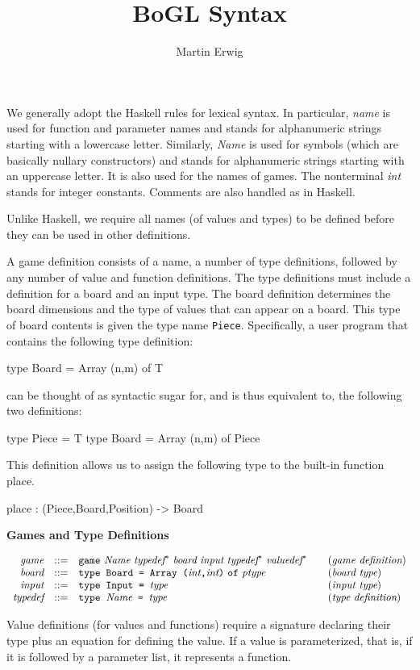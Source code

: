 \documentclass[11pt]{article}
\makeatletter
\newcommand{\prodName}[1]{&(\emph{#1})\\}
\newcommand{\nt}[1]{\textit{#1}}
\newcommand{\prog}[1]{\texttt{#1}}
\newcommand{\IS}{&::=&}
\newcommand{\syntax}[2]{
  \needspace{3\baselineskip}
  \bigskip\par\noindent\textbf{#1}\par\smallskip%
  $\begin{array}{rcl@{\qquad}l}#2\end{array}$%
  \par\bigskip\noindent\ignorespaces
}
\newcommand{\lp}{\prog{(}}
\newcommand{\rp}{\prog{)}}
\newcommand{\paren}[1]{\lp#1\rp}
\newcommand{\pair}[2]{\paren{#1\prog{,}#2}}
\makeatother
\begin{document}
\title{BoGL Syntax}
\author{Martin Erwig}
\maketitle

\noindent
%
We generally adopt the Haskell rules for lexical syntax. In particular,
\nt{name} is used for function and parameter names and stands for alphanumeric
strings starting with a lowercase letter.
%
Similarly, \nt{Name} is used for symbols (which are basically nullary
constructors) and stands for alphanumeric strings starting with an uppercase
letter. It is also used for the names of games.
%
The nonterminal \nt{int} stands for integer constants.
%
Comments are also handled as in Haskell.

Unlike Haskell, we require all names (of values and types) to be defined before
they can be used in other definitions.

A game definition consists of a name, a number of type definitions, followed by
any number of value and function definitions. The type definitions must include
a definition for a board and an input type.
%
The board definition determines the board dimensions and the type of values
that can appear on a board. This type of board contents is given the type name
\prog{Piece}. Specifically, a user program that contains the  following type
definition:

\begin{program}
type Board = Array (n,m) of T
\end{program}
%
can be thought of as syntactic sugar for, and is thus equivalent to, the
following two definitions:

\begin{program}
type Piece = T
type Board = Array (n,m) of Piece
\end{program}
%
This definition allows us to assign the following type to the built-in function
place.

\begin{program}
place : (Piece,Board,Position) -> Board
\end{program}
%

\syntax{Games and Type Definitions}{
\nt{game}    \IS  \prog{game}\ \nt{Name}
                  \ \nt{typedef}^*
                  \ \nt{board}\ \nt{input}
                  \ \nt{typedef}^*
                  \ \nt{valuedef}^*
                                                     \prodName{game definition}
\nt{board}   \IS  \prog{type Board = Array }\pair{\nt{int}}{\nt{int}}\
                  \prog{of}\ \nt{ptype}                \prodName{board type}
\nt{input}   \IS  \prog{type Input = }\nt{type}      \prodName{input type}
\nt{typedef} \IS  \prog{type }\nt{Name}\prog{ = }\nt{type}      \prodName{type definition}
}
%
Value definitions (for values and functions) require a signature declaring
their type plus an equation for defining the value. If a value is
parameterized, that is, if it is followed by a parameter list, it represents a
function.
\end{document}
